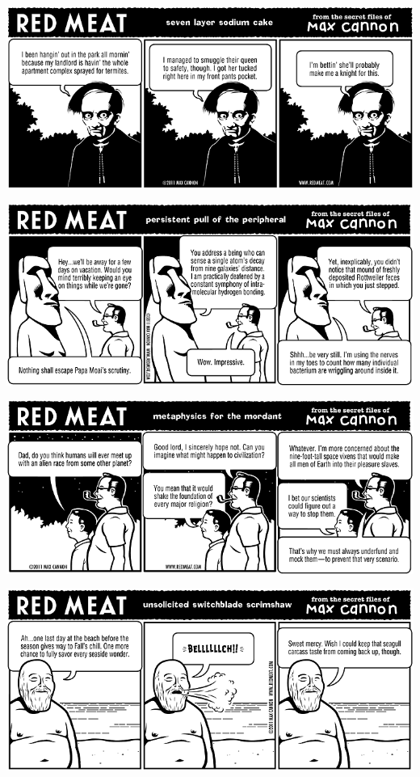 \documentclass[a4paper,twoside,11pt]{article}
\begin{document}
\includegraphics[width=\textwidth]{redmeat_2011-09-20.png}



\includegraphics[width=\textwidth]{redmeat_2011-09-27.png}



\includegraphics[width=\textwidth]{redmeat_2011-10-04.png}



\includegraphics[width=\textwidth]{redmeat_2011-10-11.png}
\end{document}
